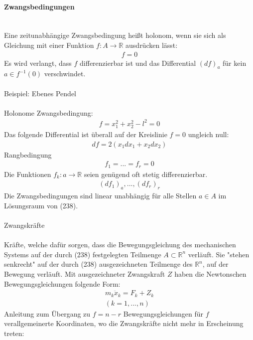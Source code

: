 \documentclass[10pt,a4paper]{article}
\begin{document}
\paragraph{Zwangsbedingungen} $\,$ \\
\\
Eine zeitunabhängige Zwangsbedingung heißt holonom, wenn sie sich als Gleichung mit einer Funktion $ f:A\longrightarrow \mathbb{R} $ ausdrücken lässt:
\begin{align}
f=0
\end{align}
Es wird verlangt, dass $f$ differenzierbar ist und das Differential $(df)_a $ für kein $ a \in f^{-1}(0) $ verschwindet.\\
\\
Beispiel: Ebenes Pendel\\
\\
Holonome Zwangsbedingung:
\begin{align}
f=x_1^2+x_2^2-l^2=0
\end{align}
Das folgende Differential ist überall auf der Kreislinie $f=0$ ungleich null:
\begin{align}
df=2(x_1dx_1+x_2dx_2)
\end{align}
Rangbedingung
\begin{align}
f_1=...=f_r=0
\end{align}
Die Funktionen $f_k: a \longrightarrow \mathbb{R} $ seien genügend oft stetig differenzierbar.
\begin{align}
{(df_1)_a,...,(df_r)_r}
\end{align}
Die Zwangsbedingungen sind linear unabhängig für alle Stellen $a \in A$ im Lösungsraum von (238).\\
\\
Zwangskräfte \\
\\
Kräfte, welche dafür sorgen, dass die Bewegungsgleichung des mechanischen Systems auf der durch (238) festgelegten Teilmenge $ A \subset \mathbb{R}^n $ verläuft. Sie "stehen senkrecht" auf der durch (238) ausgezeichneten Teilmenge des $ \mathbb{R}^n$, auf der Bewegung verläuft. Mit ausgezeichneter Zwangskraft $Z$ haben die Newtonschen Bewegungsgleichungen folgende Form:
\begin{align}
m_k \ddot{x}_k=F_k+Z_k \\
(k=1,...,n)
\end{align}
Anleitung zum Übergang zu $f=n-r$ Bewegungsgleichungen für $f$ verallgemeinerte Koordinaten, wo die Zwangskräfte nicht mehr in Erscheinung treten:\\
\end{document}

